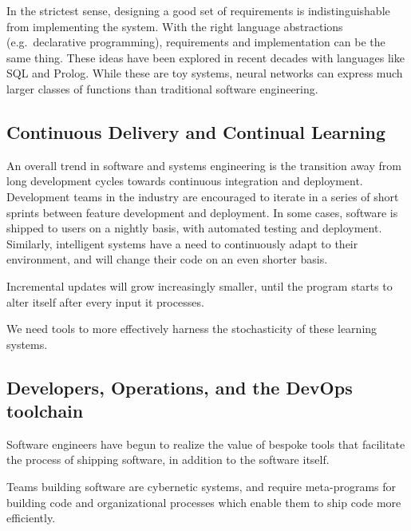 \documentclass[12pt,initial,twoside,maitrise]{dms}
\numberwithin{equation}{section}
\numberwithin{table}{chapter}
\numberwithin{figure}{chapter}
\begin{document}
In the strictest sense, designing a good set of requirements is indistinguishable from implementing the system. With the right language abstractions (e.g.\ declarative programming), requirements and implementation can be the same thing. These ideas have been explored in recent decades with languages like SQL and Prolog. While these are toy systems, neural networks can express much larger classes of functions than traditional software engineering.

\subsection{Continuous Delivery and Continual Learning}

An overall trend in software and systems engineering is the transition away from long development cycles towards continuous integration and deployment. Development teams in the industry are encouraged to iterate in a series of short sprints between feature development and deployment. In some cases, software is shipped to users on a nightly basis, with automated testing and deployment. Similarly, intelligent systems have a need to continuously adapt to their environment, and will change their code on an even shorter basis.

Incremental updates will grow increasingly smaller, until the program starts to alter itself after every input it processes.

We need tools to more effectively harness the stochasticity of these learning systems.

\subsection{Developers, Operations, and the DevOps toolchain}

Software engineers have begun to realize the value of bespoke tools that facilitate the process of shipping software, in addition to the software itself.

Teams building software are cybernetic systems, and require meta-programs for building code and organizational processes which enable them to ship code more efficiently.



\end{document}
